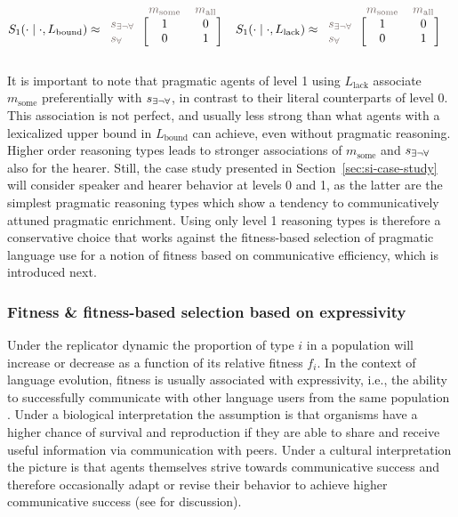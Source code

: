 \documentclass[a4paper, 11pt]{article}
\theoremstyle{Satz}
\newcommand{\state}{\ensuremath{s}\xspace}		%
\newcommand{\mystate}[1]{\ensuremath{\state_{\text{#1}}}\xspace} %
\newcommand{\mylang}[1]{\ensuremath{L_{\text{#1}}}\xspace} %
\newcommand{\messg}{\ensuremath{m}\xspace}		%
\newcommand{\mymessg}[1]{\ensuremath{\messg_{\text{#1}}}\xspace} %
\newcommand{\ssome}{\mystate{\ensuremath{\exists\neg\forall}}}
\newcommand{\sall}{\mystate{\ensuremath{\forall}}}
\newcommand{\msome}{\mymessg{some}}
\newcommand{\mall}{\mymessg{all}}
\newcommand{\Lbound}{\mylang{bound}}
\newcommand{\Llack}{\mylang{lack}}
\newcommand{\mygray}[1]{{\textcolor{mygray}{#1}}}
\begin{document}
\begin{align*}
  S_1(\cdot \mid \cdot, \Lbound) & \approx \begin{blockarray}{lcc}
    & \mygray{\msome} & \mygray{\mall} \\
    \begin{block}{l[cc]}
      \mygray{\ssome} & 1 & 0 \\
      \mygray{\sall}  & 0 & 1 \\
    \end{block}
  \end{blockarray} &
  S_1(\cdot \mid \cdot, \Llack) & \approx \begin{blockarray}{lcc}
    & \mygray{\msome} & \mygray{\mall} \\
    \begin{block}{l[cc]}
      \mygray{\ssome} & 1 & 0 \\
      \mygray{\sall}  & 0 & 1 \\
    \end{block}
  \end{blockarray} 
\end{align*}

It is important to note that pragmatic agents of level 1 using $\Llack$ associate $\msome$
preferentially with $\ssome$, in contrast to their literal counterparts of level 0. This
association is not perfect, and usually less strong than what agents with a lexicalized upper
bound in $\Lbound$ can achieve, even without pragmatic reasoning. Higher order 
reasoning types leads to stronger associations of $\msome$ and $\ssome$ also for the
hearer. Still, the case study presented in Section~\ref{sec:si-case-study} will consider
speaker and hearer behavior at levels 0 and 1, as the latter are the simplest pragmatic
reasoning types which show a tendency to communicatively attuned pragmatic enrichment. Using
only level 1 reasoning types is therefore a conservative choice that works against the
fitness-based selection of pragmatic language use for a notion of fitness based on
communicative efficiency, which is introduced next.

\subsubsection{Fitness \& fitness-based selection based on expressivity}\label{sec:expressivity}

Under the replicator dynamic the proportion of type $i$ in a population will increase or
decrease as a function of its relative fitness $f_i$. In the context of language evolution,
fitness is usually associated with expressivity, i.e., the ability to successfully communicate
with other language users from the same population
\citep[e.g.,][]{nowak+krakauer:1999,nowak+etal:2000, nowak+etal:2002}. Under a biological
interpretation the assumption is that organisms have a higher chance of survival and
reproduction if they are able to share and receive useful information via communication with
peers. Under a cultural interpretation the picture is that agents themselves strive towards
communicative success and therefore occasionally adapt or revise their behavior to achieve
higher communicative success (see \citealt[\S3.3]{benz+etal:2005b} for discussion).
\end{document}
